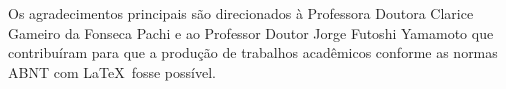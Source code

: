 \documentclass[
	12pt,				%
	openright,			%
	twoside,			%
	a4paper,			%
	english,			%
	french,				%
	spanish,			%
	brazil				%
	]{abntex2}
\begin{document}

%
% 
%



\begin{agradecimentos}
Os agradecimentos principais são direcionados à Professora Doutora  Clarice Gameiro da Fonseca Pachi e ao Professor Doutor Jorge Futoshi Yamamoto que contribuíram para que a produção de trabalhos acadêmicos conforme as normas ABNT com \LaTeX\ fosse possível.

\end{agradecimentos}


\end{document}
